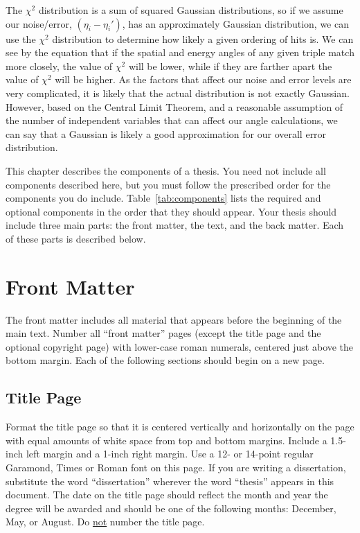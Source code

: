 The $\chi^2$ distribution is a sum of squared Gaussian distributions, so if we assume our noise/error, $(\eta_i-\eta_i')$, has an approximately Gaussian distribution, we can use the $\chi^2$ distribution to determine how likely a given ordering of hits is. We can see by the equation that if the spatial and energy angles of any given triple match more closely, the value of $\chi^2$ will be lower, while if they are farther apart the value of $\chi^2$ will be higher. As the factors that affect our noise and error levels are very complicated, it is likely that the actual distribution is not exactly Gaussian. However, based on the Central Limit Theorem, and a reasonable assumption of the number of independent variables that can affect our angle calculations, we can say that a Gaussian is likely a good approximation for our overall error distribution.

\iffalse

This chapter describes the components of a thesis.  You need not include all
components described here, but you must follow the prescribed order for the
components you do include. Table~\ref{tab:components} lists the required and
optional components in the order that they should appear.  Your thesis should
include three main parts: the front matter, the text, and the back matter.
Each of these parts is described below.

\section{Front Matter}

The front matter includes all material that appears before the beginning of the
main text.  Number all ``front matter'' pages (except the title page and the
optional copyright page) with lower-case roman numerals, centered just above
the bottom margin.  Each of the following sections should begin on a new page.

\subsection{Title Page}

Format the title page so that it is centered vertically and horizontally on the
page with equal amounts of white space from top and bottom margins.  Include a
1.5-inch left margin and a 1-inch right margin.  Use a 12- or 14-point regular
Garamond, Times or Roman font on this page.  If you are writing a dissertation,
substitute the word ``dissertation'' wherever the word ``thesis'' appears in
this document.  The date on the title page should reflect the month and year
the degree will be awarded and should be one of the following months: December,
May, or August.  Do \uline{not} number the title page.

